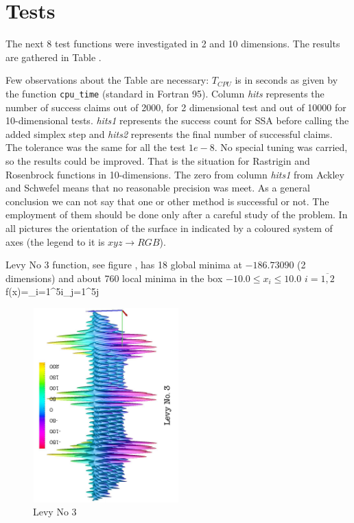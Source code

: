 \section{Tests}
\par{The next 8 test functions were investigated in 2 and 10 dimensions. The
results are gathered in Table .}
\par{Few observations about the Table  are necessary: $T_{CPU}$ is
in seconds as given by the function \verb|cpu_time| (standard in Fortran
95). Column \emph{hits} represents the number of success claims out of 2000,
for 2 dimensional test and out of 10000 for 10-dimensional tests. \emph{hits1}
represents the success count for SSA before calling the added simplex step and
\emph{hits2} represents the final number of successful claims. The tolerance
was the same for all the test $1e-8$. No special tuning was carried, so the results could be improved. That is the situation
for Rastrigin and Rosenbrock functions in 10-dimensions. The zero from column
\emph{hits1} from Ackley and Schwefel means that no reasonable precision was
meet. As a general conclusion we can not say that one or other method is
successful or not. The employment of them should be done only after a careful
study of the problem. In all pictures the orientation of the surface in
indicated by a coloured system of axes (the legend to it is $xyz\rightarrow RGB$).}
%
\par{Levy No 3 function, see figure ,  has 18 global minima at
$-186.73090$  (2 dimensions) and about 760 local minima in the box
$-10.0\leq x_i \leq 10.0$ $i=\overline{1,2}$}
%
\be
\label{levy3f}
f(x)=\sum_{i=1}^{5}i\cos[(i+1)x_1+i]\sum_{j=1}^{5}j\cos[(j+1)x_2+j]
\ee
%
\begin{figure}[tb]
\begin{center}
\includegraphics[width=0.5\textwidth,angle=-90]{figures/levy3}
\caption{\label{levy3} Levy No 3  }
\end{center}
\end{figure}
